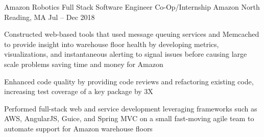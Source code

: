 \begin{cventries}
{\begin{cvitems}
       \end{cvitems}
     }
	 \cventry
    {Amazon Robotics Full Stack Software Engineer Co-Op/Internship} %
    {Amazon} %
    {North Reading, MA} %
    {Jul – Dec 2018} %
    {
    	\begin{cvitems} %
    		    \item {Constructed web-based tools that used message queuing services and Memcached to provide insight into warehouse floor health by developing metrics, visualizations, and instantaneous alerting to signal issues before causing large scale problems saving time and money for Amazon}
    			\item {Enhanced code quality by providing code reviews and refactoring existing code, increasing test coverage of a key package by 3X}
    			\item{Performed full-stack web and service development leveraging frameworks such as AWS, AngularJS, Guice, and Spring MVC on a small fast-moving agile team to automate support for Amazon warehouse floors}
    		 \end{cvitems}
    }



\end{cventries}

